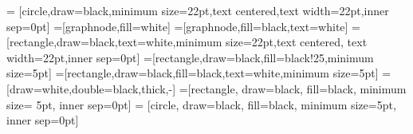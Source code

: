 \newcommand{\blackslide}{
{\setbeamercolor{background canvas}{bg=black}
  \begin{frame}[plain]
    \null
  \end{frame}
}}


\newcommand{\blackslidetext}[1]{
  {
    \setbeamercolor{frametitle}{bg=Vblue,fg=white}
    \setbeamercolor{background canvas}{bg=Vblue}%
    \setbeamercolor{structure}{fg=white}%
    \setbeamercolor{normal text}{fg=white}%
    \setbeamercolor{body}{fg=white}%
    \setbeamertemplate{itemize items}{\color{white}\starredbullet}%
    \begin{frame}
      \color{white} #1
    \end{frame}
  }
}

\usepackage{eso-pic}
\newcommand\AtPagemyUpperLeft[1]{\AtPageLowerLeft{%
\put(\LenToUnit{0.83\paperwidth},\LenToUnit{0.9\paperheight}){#1}}}

\usetikzlibrary{arrows,shapes,plotmarks,decorations.pathmorphing}
\usetikzlibrary{backgrounds,calc,positioning,fadings}

\tikzset{>=stealth'}
 =
   [circle,draw=black,minimum size=22pt,text centered,text
     width=22pt,inner sep=0pt]
   =[graphnode,fill=white]
   =[graphnode,fill=black,text=white]
   =[rectangle,draw=black,text=white,minimum
size=22pt,text centered, text width=22pt,inner sep=0pt]
   =[rectangle,draw=black,fill=black!25,minimum size=5pt]
 =[rectangle,draw=black,fill=black,text=white,minimum size=5pt]
  =[draw=white,double=black,thick,-]
 =[rectangle, draw=black, fill=black, minimum size=
5pt, inner sep=0pt]
 = [circle, draw=black, fill=black, minimum
size=5pt, inner sep=0pt]

\tikzfading[name=fade top,bottom color=transparent!0,top color=transparent!75]

\DeclareMathSymbol\leftarrowtriangle{}
\DeclareMathSymbol\rightarrowtriangle{}
\DeclareMathSymbol\sslash{}
\DeclareMathSymbol\obar{}
\DeclareMathSymbol\otimes{}
\DeclareMathSymbol\ominus{}
\DeclareMathSymbol\minuso{}
\renewcommand{\gets}{\operatorname*{\leftarrowtriangle}}
\renewcommand{\to}{\operatorname*{\rightarrowtriangle}}


